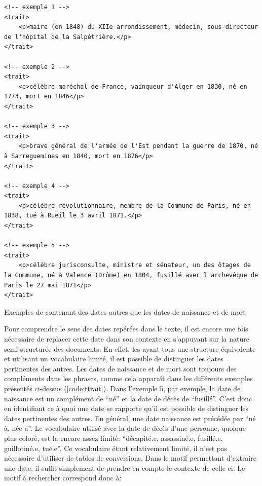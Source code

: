 \begin{listing}[h!]
	\begin{verbatim}
<!-- exemple 1 -->
<trait>
	<p>maire (en 1848) du XIIe arrondissement, médecin, sous-directeur de l'hôpital de la Salpétrière.</p>
</trait>

<!-- exemple 2 -->
<trait>
	<p>célèbre maréchal de France, vainqueur d'Alger en 1830, né en 1773, mort en 1846</p>
</trait>

<!-- exemple 3 -->
<trait>
	<p>brave général de l'armée de l'Est pendant la guerre de 1870, né à Sarreguemines en 1840, mort en 1876</p>
</trait>

<!-- exemple 4 -->
<trait>
	<p>célèbre révolutionnaire, membre de la Commune de Paris, né en 1838, tué à Rueil le 3 avril 1871.</p>
</trait>

<!-- exemple 5 -->
<trait>
	<p>célèbre jurisconsulte, ministre et sénateur, un des ôtages de la Commune, né à Valence (Drôme) en 1804, fusillé avec l'archevêque de Paris le 27 mai 1871</p>
</trait>
	\end{verbatim}
	\caption{Exemples de \ttrait{} contenant des dates autres que les dates de naissance et de mort}
	\label{code:ttrait}
\end{listing}

Pour comprendre le sens des dates repérées dans le texte, il est encore une fois nécessaire de replacer cette date dans son contexte en s'appuyant sur la nature semi-structurée des documents. En effet, les \ttrait{} ayant tous une structure équivalente et utilisant un vocabulaire limité, il est possible de distinguer les dates pertinentes des autres. Les dates de naissance et de mort sont toujours des compléments dans les phrases, comme cela apparaît dans les différents exemples présentés ci-dessus (\ref{code:ttrait}). Dans l'exemple 5, par exemple, la date de naissance est un complément de \enquote{né} et la date de décès de \enquote{fusillé}. C'est donc en identifiant ce à quoi une date se rapporte qu'il est possible de distinguer les dates pertinentes des autres. En général, une date naissance est précédée par \enquote{né à, née à}. Le vocabulaire utilisé avec la date de décès d'une personne, quoique plus coloré, est la encore assez limité: \enquote{décapité.e, assassiné.e, fusillé.e, guillotiné.e, tué.e}. Ce vocabulaire étant relativement limité, il n'est pas nécessaire d'utiliser de tables de conversions. Dans le motif permettant d'extraire une date, il suffit simplement de prendre en compte le contexte de celle-ci. Le motif à rechercher correspond donc à:

